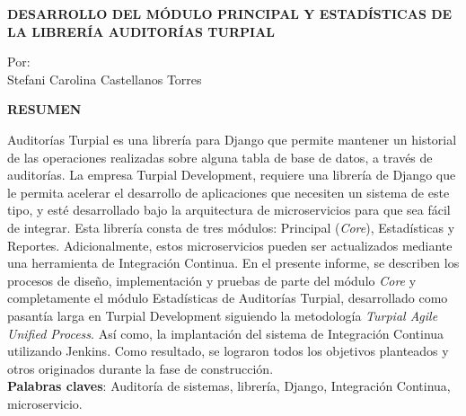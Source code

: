 \begin{center}
    \vspace{2cm}
    \textbf{
    DESARROLLO DEL MÓDULO PRINCIPAL Y ESTADÍSTICAS DE LA LIBRERÍA AUDITORÍAS TURPIAL
    }

    \vspace{2cm}

    Por:\\
    Stefani Carolina Castellanos Torres

    \vspace{2cm}

    \textbf{RESUMEN}\\

    \vspace{2cm}

\end{center}

Auditorías Turpial es una librería para Django que permite mantener un historial de las operaciones realizadas sobre alguna tabla de base de datos, a través de auditorías. La empresa Turpial Development, requiere una librería de Django que le permita acelerar el desarrollo de aplicaciones que necesiten un sistema de este tipo, y esté desarrollado bajo la arquitectura de microservicios para que sea fácil de integrar. Esta librería consta de tres módulos: Principal (\textit{Core}), Estadísticas y Reportes. Adicionalmente, estos microservicios pueden ser actualizados mediante una herramienta de Integración Continua. En el presente informe, se describen los procesos de diseño, implementación y pruebas de parte del módulo \textit{Core} y completamente el módulo Estadísticas de Auditorías Turpial, desarrollado como pasantía larga en Turpial Development siguiendo la metodología \textit{Turpial Agile Unified Process}. Así como, la implantación del sistema de Integración Continua utilizando Jenkins. Como resultado, se lograron todos los objetivos planteados y otros originados durante la fase de construcción. \\

    \textbf{Palabras claves}: Auditoría de sistemas, librería, Django, Integración Continua, microservicio.

